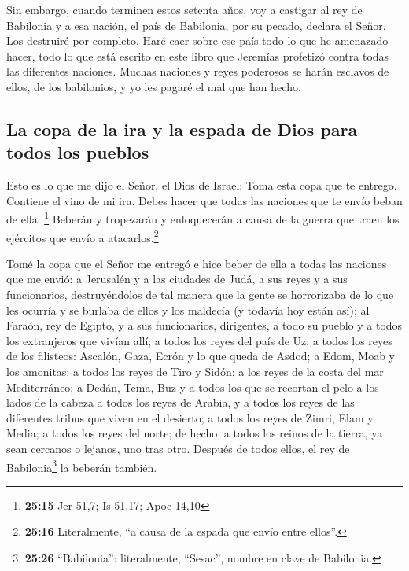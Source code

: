  Sin embargo, cuando terminen estos setenta años, voy a
castigar al rey de Babilonia y a esa nación, el país de Babilonia, por
su pecado, declara el Señor. Los destruiré por completo. 
Haré caer sobre ese país todo lo que he amenazado hacer, todo lo que
está escrito en este libro que Jeremías profetizó contra todas las
diferentes naciones.  Muchas naciones y reyes poderosos
se harán esclavos de ellos, de los babilonios, y yo les pagaré el mal
que han hecho.

\hypertarget{la-copa-de-la-ira-y-la-espada-de-dios-para-todos-los-pueblos}{%
\subsection{La copa de la ira y la espada de Dios para todos los
pueblos}\label{la-copa-de-la-ira-y-la-espada-de-dios-para-todos-los-pueblos}}

 Esto es lo que me dijo el Señor, el Dios de Israel: Toma
esta copa que te entrego. Contiene el vino de mi ira. Debes hacer que
todas las naciones que te envío beban de ella. \footnote{\textbf{25:15}
  Jer 51,7; Is 51,17; Apoc 14,10}  Beberán y tropezarán y
enloquecerán a causa de la guerra que traen los ejércitos que envío a
atacarlos.\footnote{\textbf{25:16} Literalmente, ``a causa de la espada
  que envío entre ellos''.}

 Tomé la copa que el Señor me entregó e hice beber de
ella a todas las naciones que me envió:  a Jerusalén y a
las ciudades de Judá, a sus reyes y a sus funcionarios, destruyéndolos
de tal manera que la gente se horrorizaba de lo que les ocurría y se
burlaba de ellos y los maldecía (y todavía hoy están así);
 al Faraón, rey de Egipto, y a sus funcionarios,
dirigentes, a todo su pueblo  y a todos los extranjeros
que vivían allí; a todos los reyes del país de Uz; a todos los reyes de
los filisteos: Ascalón, Gaza, Ecrón y lo que queda de Asdod;
 a Edom, Moab y los amonitas;  a todos los
reyes de Tiro y Sidón; a los reyes de la costa del mar Mediterráneo;
 a Dedán, Tema, Buz y a todos los que se recortan el pelo
a los lados de la cabeza  a todos los reyes de Arabia, y
a todos los reyes de las diferentes tribus que viven en el desierto;
 a todos los reyes de Zimri, Elam y Media;
 a todos los reyes del norte; de hecho, a todos los
reinos de la tierra, ya sean cercanos o lejanos, uno tras otro. Después
de todos ellos, el rey de Babilonia\footnote{\textbf{25:26}
  ``Babilonia'': literalmente, ``Sesac'', nombre en clave de Babilonia.}
la beberán también.

